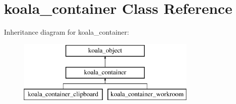 \hypertarget{classkoala__container}{
\section{koala\_\-container Class Reference}
\label{classkoala__container}
}
Inheritance diagram for koala\_\-container:\begin{figure}[H]
\begin{center}
\leavevmode
\includegraphics[height=3.000000cm]{classkoala__container}
\end{center}
\end{figure}
